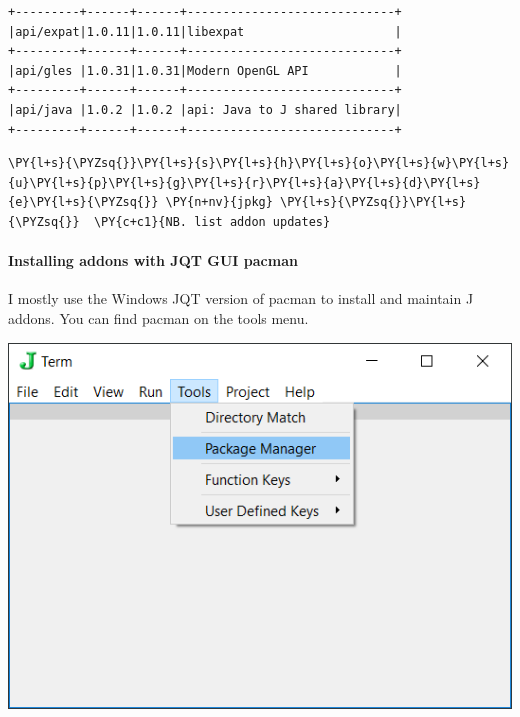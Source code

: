    \begin{Verbatim}[commandchars=\\\{\}]
+---------+------+------+-----------------------------+
|api/expat|1.0.11|1.0.11|libexpat                     |
+---------+------+------+-----------------------------+
|api/gles |1.0.31|1.0.31|Modern OpenGL API            |
+---------+------+------+-----------------------------+
|api/java |1.0.2 |1.0.2 |api: Java to J shared library|
+---------+------+------+-----------------------------+
    \end{Verbatim}

    \begin{tcolorbox}[breakable, size=fbox, boxrule=1pt, pad at break*=1mm,colback=cellbackground, colframe=cellborder]
\begin{Verbatim}[commandchars=\\\{\}]
\PY{l+s}{\PYZsq{}}\PY{l+s}{s}\PY{l+s}{h}\PY{l+s}{o}\PY{l+s}{w}\PY{l+s}{u}\PY{l+s}{p}\PY{l+s}{g}\PY{l+s}{r}\PY{l+s}{a}\PY{l+s}{d}\PY{l+s}{e}\PY{l+s}{\PYZsq{}} \PY{n+nv}{jpkg} \PY{l+s}{\PYZsq{}}\PY{l+s}{\PYZsq{}}  \PY{c+c1}{NB. list addon updates}
\end{Verbatim}
\end{tcolorbox}

    \hypertarget{installing-addons-with-jqt-gui-pacman}{%
\paragraph{Installing addons with JQT GUI
pacman}\label{installing-addons-with-jqt-gui-pacman}}

    I mostly use the Windows JQT version of pacman to install and maintain J
addons. You can find pacman on the tools menu.

\includegraphics{inclusions/jqt_pacman_menu-1.png}

